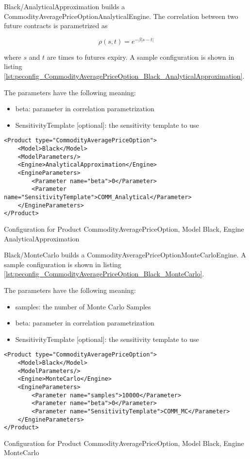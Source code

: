 Black/AnalyticalApproximation builds a CommodityAveragePriceOptionAnalyticalEngine. The correlation between two future
contracts is parametrized as

$$\rho(s, t) = e^{-\beta |s-t|}$$

where $s$ and $t$ are times to futures expiry. A sample configuration is shown in listing
\ref{lst:peconfig_CommodityAveragePriceOption_Black_AnalyticalApproximation}.

The parameters have the following meaning:

\begin{itemize}
\item beta: parameter in correlation parametrization
\item SensitivityTemplate [optional]: the sensitivity template to use 
\end{itemize}

\begin{longlisting}
\begin{verbatim}
<Product type="CommodityAveragePriceOption">
    <Model>Black</Model>
    <ModelParameters/>
    <Engine>AnalyticalApproximation</Engine>
    <EngineParameters>
        <Parameter name="beta">0</Parameter>
        <Parameter name="SensitivityTemplate">COMM_Analytical</Parameter>
    </EngineParameters>
</Product>
\end{verbatim}
\caption{Configuration for Product CommodityAveragePriceOption, Model Black, Engine AnalyticalApproximation}
\label{lst:peconfig_CommodityAveragePriceOption_Black_AnalyticalApproximation}
\end{longlisting}

Black/MonteCarlo builds a CommodityAveragePriceOptionMonteCarloEngine. A sample configuration is shown in listing
\ref{lst:peconfig_CommodityAveragePriceOption_Black_MonteCarlo}.

The parameters have the following meaning:

\begin{itemize}
\item samples: the number of Monte Carlo Samples
\item beta: parameter in correlation parametrization
\item SensitivityTemplate [optional]: the sensitivity template to use 
\end{itemize}

\begin{longlisting}
\begin{verbatim}
<Product type="CommodityAveragePriceOption">
    <Model>Black</Model>
    <ModelParameters/>
    <Engine>MonteCarlo</Engine>
    <EngineParameters>
        <Parameter name="samples">10000</Parameter>
        <Parameter name="beta">0</Parameter>
        <Parameter name="SensitivityTemplate">COMM_MC</Parameter>
    </EngineParameters>
</Product>
\end{verbatim}
\caption{Configuration for Product CommodityAveragePriceOption, Model Black, Engine MonteCarlo}
\label{lst:peconfig_CommodityAveragePriceOption_Black_MonteCarlo}
\end{longlisting}

